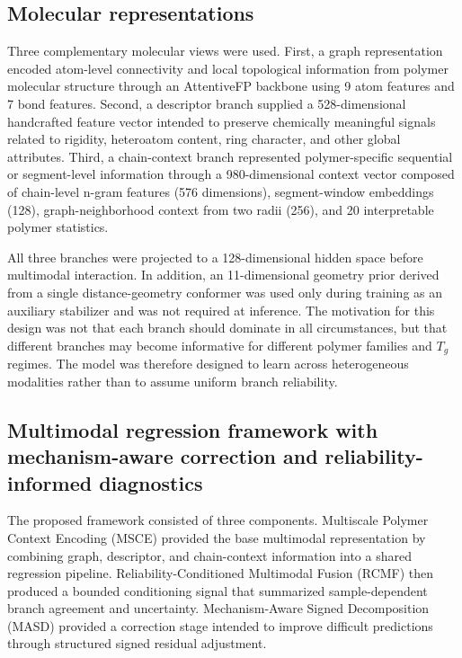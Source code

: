 \documentclass[review,12pt]{elsarticle}
\begin{document}
\subsection{Molecular representations}

Three complementary molecular views were used. First, a graph representation encoded atom-level connectivity and local topological information from polymer molecular structure through an AttentiveFP backbone \cite{xiong2020pushing} using 9 atom features and 7 bond features. Second, a descriptor branch supplied a 528-dimensional handcrafted feature vector intended to preserve chemically meaningful signals related to rigidity, heteroatom content, ring character, and other global attributes. Third, a chain-context branch represented polymer-specific sequential or segment-level information through a 980-dimensional context vector composed of chain-level n-gram features (576 dimensions), segment-window embeddings (128), graph-neighborhood context from two radii (256), and 20 interpretable polymer statistics.

All three branches were projected to a 128-dimensional hidden space before multimodal interaction. In addition, an 11-dimensional geometry prior derived from a single distance-geometry conformer was used only during training as an auxiliary stabilizer and was not required at inference. The motivation for this design was not that each branch should dominate in all circumstances, but that different branches may become informative for different polymer families and $T_g$ regimes. The model was therefore designed to learn across heterogeneous modalities rather than to assume uniform branch reliability.

\subsection{Multimodal regression framework with mechanism-aware correction and reliability-informed diagnostics}

The proposed framework consisted of three components. Multiscale Polymer Context Encoding (MSCE) provided the base multimodal representation by combining graph, descriptor, and chain-context information into a shared regression pipeline. Reliability-Conditioned Multimodal Fusion (RCMF) then produced a bounded conditioning signal that summarized sample-dependent branch agreement and uncertainty. Mechanism-Aware Signed Decomposition (MASD) provided a correction stage intended to improve difficult predictions through structured signed residual adjustment.
\end{document}
